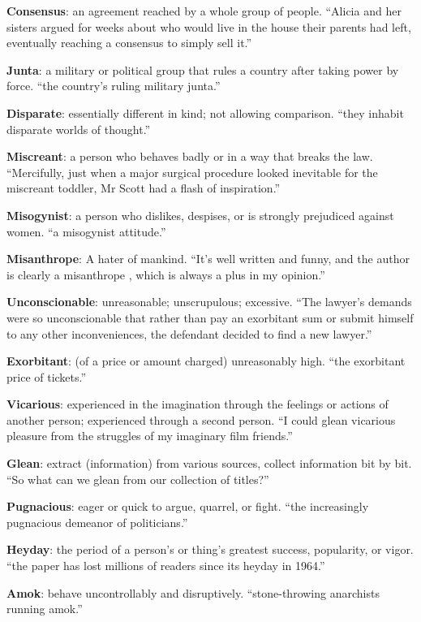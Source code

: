 \documentclass[12pt, a4paper]{ximera}
\begin{document}
\textbf{Consensus}: an agreement reached by a whole group of people. ``Alicia and her sisters argued for weeks about who would live in the house their parents had left, eventually reaching a consensus to simply sell it.''

\textbf{Junta}: a military or political group that rules a country after taking power by force. ``the country's ruling military junta.''

\textbf{Disparate}: essentially different in kind; not allowing comparison. ``they inhabit disparate worlds of thought.''

\textbf{Miscreant}: a person who behaves badly or in a way that breaks the law. ``Mercifully, just when a major surgical procedure looked inevitable for the miscreant toddler, Mr Scott had a flash of inspiration.''

\textbf{Misogynist}: a person who dislikes, despises, or is strongly prejudiced against women. ``a misogynist attitude.''

\textbf{Misanthrope}: A hater of mankind. ``It's well written and funny, and the author is clearly a misanthrope , which is always a plus in my opinion.''

\textbf{Unconscionable}: unreasonable; unscrupulous; excessive. ``The lawyer’s demands were so unconscionable that rather than pay an exorbitant sum or submit himself to any other inconveniences, the defendant decided to find a new lawyer.''

\textbf{Exorbitant}: (of a price or amount charged) unreasonably high. ``the exorbitant price of tickets.''

\textbf{Vicarious}: experienced in the imagination through the feelings or actions of another person; experienced through a second person. ``I could glean vicarious pleasure from the struggles of my imaginary film friends.''

\textbf{Glean}: extract (information) from various sources, collect information bit by bit. ``So what can we glean from our collection of titles?''

\textbf{Pugnacious}: eager or quick to argue, quarrel, or fight. ``the increasingly pugnacious demeanor of politicians.''

\textbf{Heyday}: the period of a person's or thing's greatest success, popularity, or vigor. ``the paper has lost millions of readers since its heyday in 1964.''

\textbf{Amok}: behave uncontrollably and disruptively. ``stone-throwing anarchists running amok.''
\end{document}
